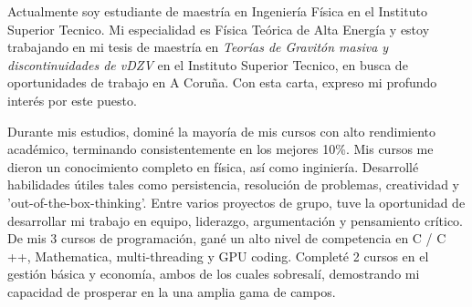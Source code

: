 \documentclass[10pt,stdletter,dateno,sigleft]{newlfm} %
\begin{document}
\begin{newlfm}



Actualmente soy estudiante de maestría en Ingeniería Física en el Instituto Superior Tecnico. Mi especialidad es Física Teórica de Alta Energía y estoy trabajando en mi tesis de maestría en \emph{Teorías de Gravitón masiva y discontinuidades de vDZV} en el Instituto Superior Tecnico, en busca de oportunidades de trabajo en A Coruña. Con esta carta, expreso mi profundo interés por este puesto.






Durante mis estudios, dominé la mayoría de mis cursos con alto rendimiento académico, terminando consistentemente en los mejores 10\%. Mis cursos me dieron un conocimiento completo en física, así como inginiería. Desarrollé habilidades útiles tales como persistencia, resolución de problemas, creatividad y 'out-of-the-box-thinking'. Entre varios proyectos de grupo, tuve la oportunidad de desarrollar mi trabajo en equipo, liderazgo, argumentación y pensamiento crítico. De mis 3 cursos de programación, gané un alto nivel de competencia en C / C ++, Mathematica, multi-threading y GPU coding. Completé 2 cursos en el gestión básica y economía, ambos de los cuales sobresalí, demostrando mi capacidad de prosperar en la una amplia gama de campos.



\end{newlfm}
\end{document}
